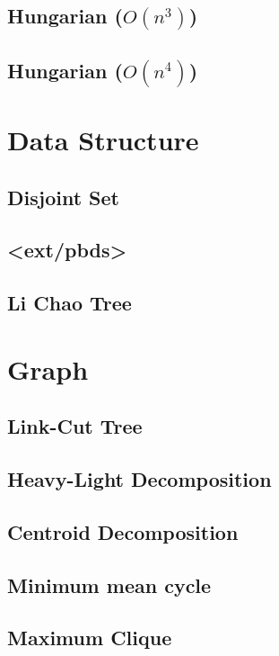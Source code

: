 \documentclass[a4paper,10pt,twocolumn,oneside]{article}
\begin{document}
\subsection{Hungarian ($O(n^3)$)}

\subsection{Hungarian ($O(n^4)$)}

\section{Data Structure}
\subsection{Disjoint Set}

\subsection{<ext/pbds>}

\subsection{Li Chao Tree}

\section{Graph}
\subsection{Link-Cut Tree}

\subsection{Heavy-Light Decomposition}

\subsection{Centroid Decomposition}

\subsection{Minimum mean cycle}

\subsection{Maximum Clique}

\end{document}
